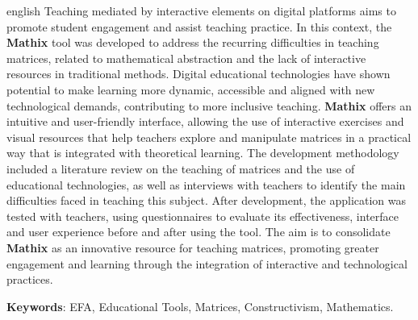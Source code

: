 \begin{resumo}[Abstract]
 \begin{otherlanguage*}{english}
Teaching mediated by interactive elements on digital platforms aims to promote student engagement and assist teaching practice. In this context, the \textbf{Mathix} tool was developed to address the recurring difficulties in teaching matrices, related to mathematical abstraction and the lack of interactive resources in traditional methods. Digital educational technologies have shown potential to make learning more dynamic, accessible and aligned with new technological demands, contributing to more inclusive teaching. \textbf{Mathix} offers an intuitive and user-friendly interface, allowing the use of interactive exercises and visual resources that help teachers explore and manipulate matrices in a practical way that is integrated with theoretical learning. The development methodology included a literature review on the teaching of matrices and the use of educational technologies, as well as interviews with teachers to identify the main difficulties faced in teaching this subject. After development, the application was tested with teachers, using questionnaires to evaluate its effectiveness, interface and user experience before and after using the tool. The aim is to consolidate \textbf{Mathix} as an innovative resource for teaching matrices, promoting greater engagement and learning through the integration of interactive and technological practices.


   \vspace{\onelineskip}
   \noindent 
   \textbf{Keywords}: EFA, Educational Tools, Matrices, Constructivism, Mathematics.
 \end{otherlanguage*}
\end{resumo}